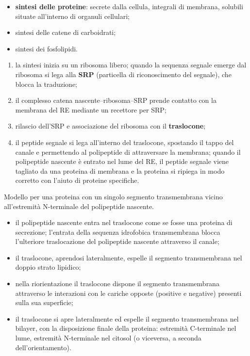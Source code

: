 \begin{itemize}
  \item \textbf{sintesi delle proteine}: secrete dalla cellula, integrali di membrana, solubili situate all'interno di organuli cellulari;
  \item sintesi delle catene di carboidrati;
  \item sintesi dei fosfolipidi.
\end{itemize}

\begin{enumerate}
  \item la sintesi inizia su un ribosoma libero; quando la sequenza segnale emerge dal ribosoma si lega alla \textbf{SRP} (particella di riconoscimento del segnale), che blocca la traduzione;
  \item il complesso catena nascente--ribosoma--SRP prende contatto con la membrana del RE mediante un recettore per SRP;
  \item rilascio dell'SRP e associazione del ribosoma con il \textbf{traslocone};
  \item il peptide segnale si lega all'interno del traslocone, spostando il tappo del canale e permettendo al polipeptide di attraversare la membrana; quando il polipeptide nascente è entrato nel lume del RE, il peptide segnale viene tagliato da una proteina di membrana e la proteina si ripiega in modo corretto con l'aiuto di proteine specifiche.
\end{enumerate}

Modello per una proteina con un singolo segmento transmembrana vicino all'estremità N-terminale del polipeptide nascente.
\begin{itemize}
  \item il polipeptide nascente entra nel traslocone come se fosse una proteina di secrezione; l'entrata della sequenza idrofobica transmembrana blocca l'ulteriore traslocazione del polipeptide nascente attraverso il canale;
  \item il traslocone, aprendosi lateralmente, espelle il segmento transmembrana nel doppio strato lipidico;
  \item nella riorientazione il traslocone dispone il segmento transmembrana attraverso le interazioni con le cariche opposte (positive e negative) presenti sulla sua superficie;
  \item il traslocone si apre lateralmente ed espelle il segmento transmembrana nel bilayer, con la disposizione finale della proteina: estremità C-terminale nel lume, estremità N-terminale nel citosol (o viceversa, a seconda dell'orientamento).
\end{itemize}

